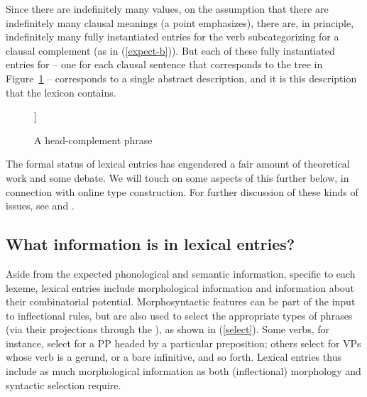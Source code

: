 \documentclass[output=paper
 	        ,biblatex
                ,babelshorthands
                ,newtxmath
                ,draftmode
                ,colorlinks, citecolor=brown
]{langscibook}
\begin{document}
Since there are indefinitely many  values, on the assumption that there are indefinitely many clausal meanings (a point \citealt[8--9]{Jackendoff1990} emphasizes), there are, in principle, indefinitely many fully instantiated entries for the verb  subcategorizing for a clausal complement (as in (\ref{expect-b})). 
But each of these fully instantiated entries for  -- one for each clausal sentence that corresponds to the tree in Figure~\ref{expect-b-tree} -- corresponds to a single abstract description, and it is this description that the lexicon contains. 

\begin{figure}
	\begin{forest}
	[ [{\avm{[comps & < \1 >]}} ] 
	[{\avm{[synsem & \1 ]}} ] ]
\end{forest}	
\caption{\label{expect-b-tree} A head-complement phrase}
\end{figure}


The formal status of lexical entries has engendered a fair amount of theoretical work and some debate.
We will touch on some aspects of this further below, in connection with online type construction.
For further discussion of these kinds of issues, see  and .

\subsection{What information is in lexical entries?}

Aside from the expected phonological and semantic information, specific to each lexeme, lexical entries include morphological information and information about their combinatorial potential. Morphosyntactic features can be part of the input to inflectional rules, but are also used to select the appropriate types of phrases (via their projections through the ), as shown in (\ref{select}). Some verbs, for instance, select for a PP headed by a particular preposition; others select for VPs whose verb is a gerund, or a bare infinitive, and so forth. Lexical entries thus include as much morphological information as both (inflectional) morphology and syntactic selection require.
\end{document}
